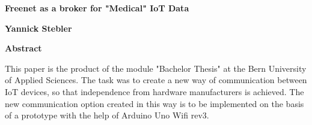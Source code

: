\thispagestyle{plain}
\begin{center}
    \Large
    \textbf{Freenet as a broker for "Medical" IoT Data}
        
    \vspace{0.4cm}
    \textbf{Yannick Stebler}
       
    \vspace{0.9cm}
    \textbf{Abstract}
\end{center}
This paper is the product of the module "Bachelor Thesis" at the Bern University of Applied Sciences. The task was to create a new way of communication between IoT devices, so that independence from hardware manufacturers is achieved. The new communication option created in this way is to be implemented on the basis of a prototype with the help of Arduino Uno Wifi rev3.